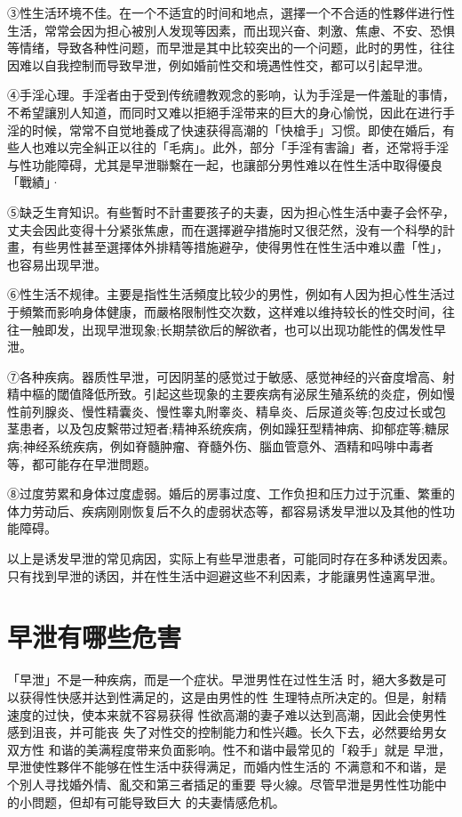 \documentclass[12pt,UTF8]{ctexbook}
\begin{document}
③性生活环境不佳。在一个不适宜的时间和地点，選擇一个不合适的性夥伴进行性生活，常常会因为担心被別人发现等因素，而出现兴奋、刺激、焦慮、不安、恐惧等情绪，导致各种性问题，而早泄是其中比较突出的一个问题，此时的男性，往往因难以自我控制而导致早泄，例如婚前性交和境遇性性交，都可以引起早泄。

④手淫心理。手淫者由于受到传统禮教观念的影响，认为手淫是一件羞耻的事情，不希望讓別人知道，而同时又难以拒絕手淫带来的巨大的身心愉悦，因此在进行手淫的时候，常常不自觉地養成了快速获得高潮的「快槍手」习惯。即使在婚后，有些人也难以完全糾正以往的「毛病」。此外，部分「手淫有害論」者，还常将手淫与性功能障碍，尤其是早泄聯繫在一起，也讓部分男性难以在性生活中取得優良「戰績」·

⑤缺乏生育知识。有些暫时不計畫要孩子的夫妻，因为担心性生活中妻子会怀孕，丈夫会因此变得十分紧张焦慮，而在選擇避孕措施时又很茫然，没有一个科學的計畫，有些男性甚至選擇体外排精等措施避孕，使得男性在性生活中难以盡「性」，也容易出现早泄。

⑥性生活不规律。主要是指性生活頻度比较少的男性，例如有人因为担心性生活过于頻繁而影响身体健康，而嚴格限制性交次数，这样难以维持较长的性交时间，往往一触即发，出现早泄现象;长期禁欲后的解欲者，也可以出现功能性的偶发性早泄。

⑦各种疾病。器质性早泄，可因阴茎的感觉过于敏感、感觉神经的兴奋度增高、射精中樞的閾值降低所致。引起这些现象的主要疾病有泌尿生殖系统的炎症，例如慢性前列腺炎、慢性精囊炎、慢性睾丸附睾炎、精阜炎、后尿道炎等;包皮过长或包茎患者，以及包皮繫带过短者;精神系统疾病，例如躁狂型精神病、抑郁症等;糖尿病;神经系统疾病，例如脊髓肿瘤、脊髓外伤、腦血管意外、酒精和吗啡中毒者等，都可能存在早泄問题。

⑧过度劳累和身体过度虚弱。婚后的房事过度、工作负担和压力过于沉重、繁重的体力劳动后、疾病刚刚恢复后不久的虚弱状态等，都容易诱发早泄以及其他的性功能障碍。

以上是诱发早泄的常见病因，实际上有些早泄患者，可能同时存在多种诱发因素。只有找到早泄的诱因，并在性生活中迴避这些不利因素，才能讓男性遠离早泄。

\section{早泄有哪些危害}

「早泄」不是一种疾病，而是一个症状。早泄男性在过性生活
时，絕大多数是可以获得性快感并达到性满足的，这是由男性的性
生理特点所决定的。但是，射精速度的过快，使本来就不容易获得
性欲高潮的妻子难以达到高潮，因此会使男性感到沮丧，并可能丧
失了对性交的控制能力和性兴趣。长久下去，必然要给男女双方性
和谐的美满程度带来负面影响。性不和谐中最常见的「殺手」就是
早泄，早泄使性夥伴不能够在性生活中获得满足，而婚内性生活的
不满意和不和谐，是个別人寻找婚外情、亂交和第三者插足的重要
导火線。尽管早泄是男性性功能中的小問题，但却有可能导致巨大
的夫妻情感危机。
\end{document}
